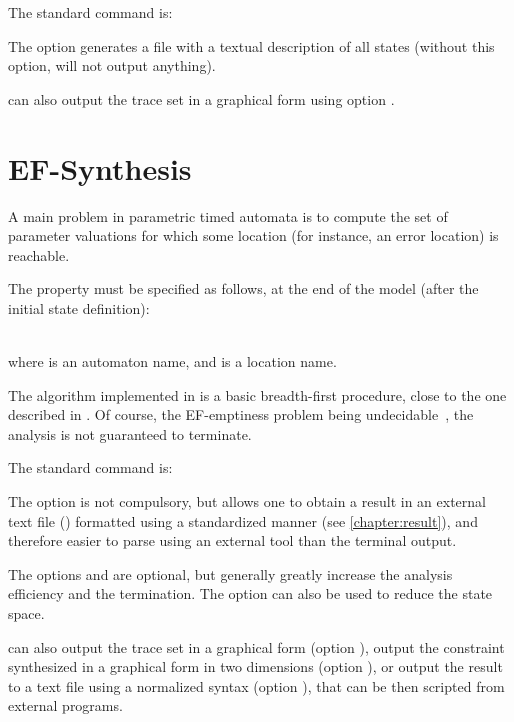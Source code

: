 The standard command is:


The option  generates a file with a textual description of all states (without this option, \imitator{} will not output anything).

\imitator{} can also output the trace set in a graphical form using option .


\section{EF-Synthesis}\label{ss:mode:EFsynth}

A main problem in parametric timed automata is to compute the set of parameter valuations for which some location (for instance, an error location) is reachable.

The property must be specified as follows, at the end of the model (after the initial state definition):

\\
where  is an automaton name, and  is a location name.

The algorithm \EFsynth{} implemented in \imitator{} is a basic breadth-first procedure, close to the one described in \cite{JLR15}.
Of course, the EF-emptiness problem being undecidable~\cite{AHV93}, the analysis is not guaranteed to terminate.

The standard command is:



The option  is not compulsory, but allows one to obtain a result in an external text file () formatted using a standardized manner (see \cref{chapter:result}), and therefore easier to parse using an external tool than the terminal output.

The options  and  are optional, but generally greatly increase the analysis efficiency and the termination.
The option  can also be used to reduce the state space.

\imitator{} can also
	output the trace set in a graphical form (option ),
	output the constraint synthesized in a graphical form in two dimensions (option ),
	or
	output the result to a text file using a normalized syntax (option ), that can be then scripted from external programs.


